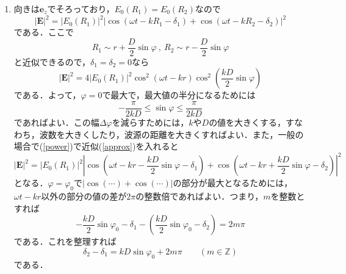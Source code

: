 \documentclass[a4paper,pdflatex,ja=standard]{bxjsarticle}
\begin{document}
\begin{enumerate}
  \item 
  向きは$\bm{e}_{z}$でそろっており，$E_{0}(R_{1})=E_{0}(R_{2})$なので
  \begin{equation}
    |\bm{E}|^{2}
    =
    |E_{0}(R_{1})|^2
    |\cos(\omega t-kR_{1}-\delta_{1})+\cos(\omega t-kR_{2}-\delta_{2})|^2
    \label{power}
  \end{equation}
  である．ここで
  \begin{equation}
    R_{1}
    \sim
    r+\frac{D}{2}\sin\varphi
    \ ,\ 
    R_{2}
    \sim
    r-\frac{D}{2}\sin\varphi
    \label{approx}
  \end{equation}
  と近似できるので，$\delta_{1}=\delta_{2}=0$なら
  \begin{equation}
    |\bm{E}|^2
    =
    4|E_{0}(R_{1})|^2
    \cos^2(\omega t-kr)
    \cos^2\left( \frac{kD}{2}\sin\varphi \right)
  \end{equation}
  である．よって，$\varphi=0$で最大で，最大値の半分になるためには
  \begin{equation}
    -\frac{\pi}{2kD}
    \leq
    \sin\varphi
    \leq
    \frac{\pi}{2kD}
  \end{equation}
  であればよい．この幅$\Delta\varphi$を減らすためには，$k$や$D$の値を大きくする，すなわち，波数を大きくしたり，波源の距離を大きくすればよい．また，一般の場合で(\ref{power})で近似(\ref{approx})を入れると
  \begin{equation}
    |\bm{E}|^2
    =
    |E_{0}(R_{1})|^2
    \left|
      \cos\left( \omega t-kr-\frac{kD}{2}\sin\varphi-\delta_{1} \right)
      +
      \cos\left( \omega t-kr+\frac{kD}{2}\sin\varphi-\delta_{2} \right)
    \right|^2
  \end{equation}
  となる．$\varphi=\varphi_{0}$で$|\cos(\cdots)+\cos(\cdots)|$の部分が最大となるためには，$\omega t-kr$以外の部分の値の差が$2\pi$の整数倍であればよい．つまり，$m$を整数とすれば
  \begin{equation}
    -\frac{kD}{2}\sin\varphi_{0}
    -
    \delta_{1}
    -
    \left( \frac{kD}{2}\sin\varphi_{0}
    -
    \delta_{2} \right)
    =
    2m\pi
  \end{equation}
  である．これを整理すれば
  \begin{equation}
    \delta_{2}
    -
    \delta_{1}
    =
    kD\sin\varphi_{0}
    +
    2m\pi
    \qquad
    (m\in\mathbb{Z})
  \end{equation}
  である．

\end{enumerate}
\end{document}
